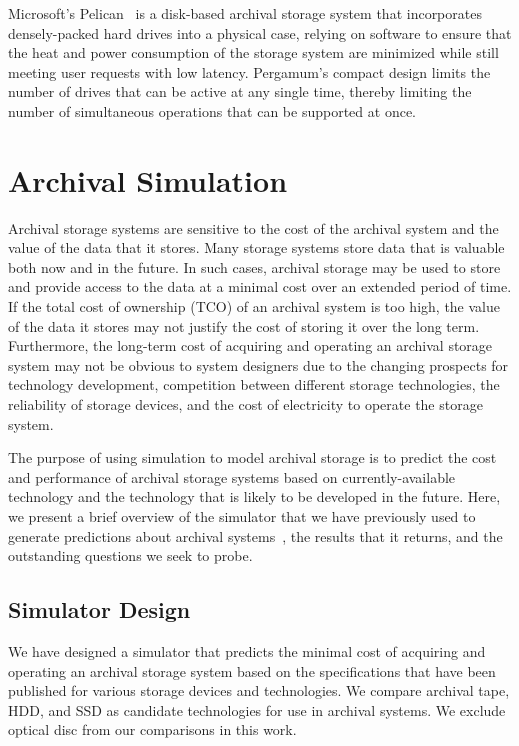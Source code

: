 Microsoft's Pelican~\cite{ pelican} is a disk-based archival storage system that incorporates densely-packed hard drives into a physical case, relying on software to ensure that the heat and power consumption of the storage system are minimized while still meeting user requests with low latency.  Pergamum's compact design limits the number of drives that can be active at any single time, thereby limiting the number of simultaneous operations that can be supported at once.

\section{Archival Simulation}
Archival storage systems are sensitive to the cost of the archival system and the value of the data that it stores.  Many storage systems store data that is valuable both now and in the future.  In such cases, archival storage may be used to store and provide access to the data at a minimal cost over an extended period of time.  If the total cost of ownership (TCO) of an archival system is too high, the value of the data it stores may not justify the cost of storing it over the long term.  Furthermore, the long-term cost of acquiring and operating an archival storage system may not be obvious to system designers due to the changing prospects for technology development, competition between different storage technologies, the reliability of storage devices, and the cost of electricity to operate the storage system.

The purpose of using simulation to model archival storage is to predict the cost and performance of archival storage systems based on currently-available technology and the technology that is likely to be developed in the future.  Here, we present a brief overview of the simulator that we have previously used to generate predictions about archival systems~\cite{byronmaster}, the results that it returns, and the outstanding questions we seek to probe.

\subsection{Simulator Design}
We have designed a simulator that predicts the minimal cost of acquiring and operating an archival storage system based on the specifications that have been published for various storage devices and technologies.  We compare archival tape, HDD, and SSD as candidate technologies for use in archival systems.  We exclude optical disc from our comparisons in this work.


